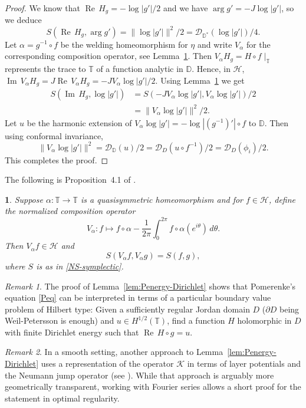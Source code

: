 \documentclass{article}
\numberwithin{equation}{section}
\numberwithin{figure}{section}
\theoremstyle{plain}
\theoremstyle{plain}
\newtheorem{lemma}[thm]{\protect\lemmaname}
\numberwithin{thm}{section}
\theoremstyle{remark}
\newtheorem*{rem}{Remark}
\providecommand{\lemmaname}{Lemma}
\newcommand{\imag}{\operatorname{Im} \,}
\newcommand{\real}{\operatorname{Re} \,}
\renewcommand{\Im}{\imag}
\renewcommand{\Re}{\real}
\newcommand{\T}{\mathbb{T}}
\newcommand{\D}{\mathbb{D}}
\begin{document}
\begin{proof}
We know that $\Re H_g = - \log| g' | /2$ and we have $\arg g' = -J \log|g'|$, so we deduce \[S(\Re H_g, \arg g') = \|\log|g'|\|^2/2= \mathcal{D}_{\D^*}(\log|g'|)/4.\] 
Let $\alpha = g^{-1} \circ f$ be the welding homeomorphism for $\eta$ and write $V_\alpha$ for the corresponding  composition operator, see Lemma~\ref{lem:S-symmetry}. Then $V_\alpha H_g =  H\circ f\mid_{\T}$ represents the trace to $\T$ of a function analytic in $\D$. Hence, in $\mathscr{H}$, $\Im V_\alpha H_g = J   \Re V_\alpha H_g = -J V_\alpha \log |g'|/2.$ Using Lemma~\ref{lem:S-symmetry} we get
\begin{align*}
S(\Im H_g, \log|g'|) & =   S(-J V_\alpha \log |g'|, V_\alpha \log|g'|)/2 \\ 
& =\|V_\alpha \log |g'|\|^2/2.
\end{align*}
Let $u$ be the harmonic extension of $V_\alpha \log |g'| = -\log|(g^{-1})'| \circ f$ to $\D$. Then using conformal invariance,
\[
\|V_\alpha \log |g'|\|^2 = \mathcal{D}_{\D}(u)/2 =  \mathcal{D}_{D}(u \circ f^{-1})/2 =  \mathcal{D}_{D}(\phi_i)/2.
\]
This completes the proof.
\end{proof}
The following is Proposition~4.1 of \cite{NS}.
\begin{lemma}\label{lem:S-symmetry}
Suppose $\alpha: \T \to \T$ is a quasisymmetric homeomorphism and for $f \in \mathscr{H}$, define the normalized composition operator
\[
 V_\alpha:  f \mapsto f\circ \alpha - \frac{1}{2\pi}\int_0^{2\pi} f \circ \alpha(e^{i\theta}) \, d\theta.
\]
 Then $ V_\alpha f \in \mathscr{H}$ and 
\[
S( V_\alpha f,  V_\alpha g) = S(f,g),
\]
where $S$ is as in \eqref{NS-symplectic}.
\end{lemma}
\begin{rem}
 The proof of Lemma~\ref{lem:Penergy-Dirichlet} shows that Pomerenke's equation \eqref{Peq} can be interpreted in terms of a particular boundary value problem of Hilbert type: Given a sufficiently regular Jordan domain $D$ ($\partial D$ being Weil-Petersson is enough) and $u \in H^{1/2}(\T)$, find a function $H$ holomorphic in $D$ with finite Dirichlet energy such that $\Re H \circ g = u$.
\end{rem}
\begin{rem}
In a smooth setting, another approach to Lemma~\ref{lem:Penergy-Dirichlet} uses a representation of the operator $\mathcal{K}$ in terms of layer potentials and the Neumann jump operator (see \cite{CoJo, WiZa}). While that approach is arguably more geometrically transparent, working with Fourier series allows a short proof for the statement in optimal regularity. 
\end{rem}
\end{document}
